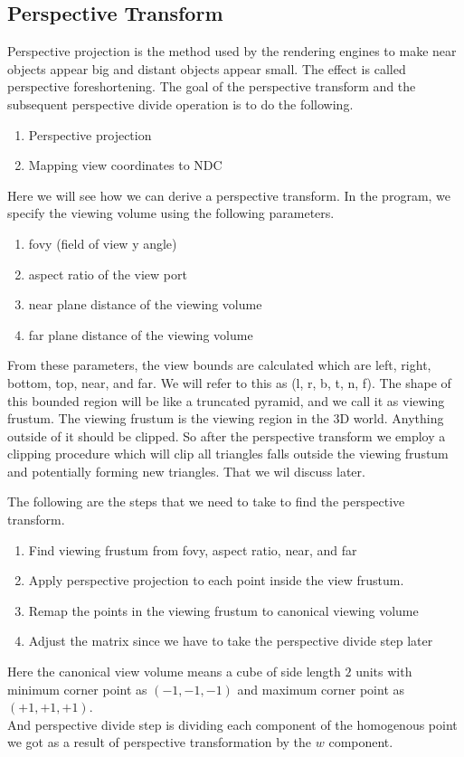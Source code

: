\subsection{Perspective Transform}
Perspective projection is the method used by the rendering engines to make near objects appear big and distant objects appear small. The effect is called perspective foreshortening. The goal of the perspective transform and the subsequent perspective divide operation is to do the following.
\begin{enumerate}
\item Perspective projection
\item Mapping view coordinates to NDC
\end{enumerate}
Here we will see how we can derive a perspective transform.
In the program, we specify the viewing volume using the following parameters.
\begin{enumerate}
    \item fovy (field of view y angle)
    \item aspect ratio of the view port
    \item near plane distance of the viewing volume
    \item far plane distance of the viewing volume
\end{enumerate}
From these parameters, the view bounds are calculated which are left, right, bottom, top, near, and far. We will refer to this as (l, r, b, t, n, f). The shape of this bounded region will be like a truncated pyramid, and we call it as viewing frustum. The viewing frustum is the viewing region in the 3D world. Anything outside of it should be clipped. So after the perspective transform we employ a clipping procedure which will clip all triangles falls outside the viewing frustum and potentially forming new triangles.
That we wil discuss later.

The following are the steps that we need to take to find the perspective transform.
\vspace{1em}
\begin{enumerate}
    \item Find viewing frustum from fovy, aspect ratio, near, and far
    \item Apply perspective projection to each point inside the view frustum.
    \item Remap the points in the viewing frustum to canonical viewing volume
    \item Adjust the matrix since we have to take the perspective divide step later
\end{enumerate}
Here the canonical view volume means a cube of side length $2$ units with minimum corner point as $(-1, -1, -1)$ and maximum corner point as $(+1, +1, +1)$. \\
And perspective divide step is dividing each component of the homogenous point we got as a result of  perspective transformation by the $w$ component.\\

